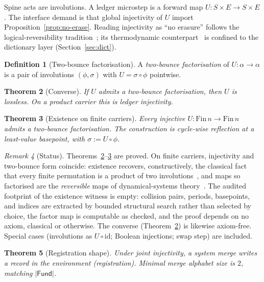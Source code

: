 \documentclass[11pt,a4paper]{article}
\theoremstyle{plain}
\newtheorem{theorem}{Theorem}[section]
\theoremstyle{definition}
\newtheorem{definition}[theorem]{Definition}
\theoremstyle{remark}
\newtheorem{remark}[theorem]{Remark}
\newcommand{\Fund}{\mathsf{Fund}}
\newcommand{\comp}{\circ}
\begin{document}
Spine acts are involutions. A ledger microstep is a forward map
$U:S\times E\to S\times E$. The interface demand is that global
injectivity of $U$ import Proposition~\ref{prop:no-erase}. Reading
injectivity as ``no erasure'' follows the logical-reversibility
tradition~\cite{bennett,fredkintoffoli}; its thermodynamic
counterpart~\cite{landauer} is confined to the dictionary layer
(Section~\ref{sec:dict}).

\begin{definition}[Two-bounce factorisation]
\label{def:twobounce}
A \emph{two-bounce factorisation} of $U:\alpha\to\alpha$ is a pair of
involutions $(\phi,\sigma)$ with $U=\sigma\comp\phi$ pointwise.
\end{definition}

\begin{theorem}[Converse]
\label{thm:converse}
If $U$ admits a two-bounce factorisation, then $U$ is lossless. On a
product carrier this is ledger injectivity.
\end{theorem}

\begin{theorem}[Existence on finite carriers]
\label{thm:exists}
Every injective $U:\mathrm{Fin}\,n\to\mathrm{Fin}\,n$ admits a
two-bounce factorisation. The construction is cycle-wise reflection at a
least-value basepoint, with $\sigma:=U\comp\phi$.
\end{theorem}

\begin{remark}[Status]
Theorems~\ref{thm:converse}--\ref{thm:exists} are proved. On finite
carriers, injectivity and two-bounce form coincide: existence recovers,
constructively, the classical fact that every finite permutation is a
product of two involutions~\cite{petersentenner}, and maps so factorised
are the \emph{reversible} maps of dynamical-systems
theory~\cite{lambroberts}. The audited footprint of the existence
witness is empty: collision pairs, periods, basepoints, and indices are
extracted by bounded structural search rather than selected by choice,
the factor map is computable as checked, and the proof depends on no
axiom, classical or otherwise. The converse
(Theorem~\ref{thm:converse}) is likewise axiom-free. Special cases
(involutions as $U\comp\mathrm{id}$; Boolean injections; swap step) are
included.
\end{remark}

\begin{theorem}[Registration shape]
\label{thm:reg}
Under joint injectivity, a system merge writes a record in the
environment (registration). Minimal merge alphabet size is $2$, matching
$|\Fund|$.
\end{theorem}
\end{document}
